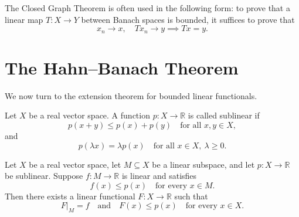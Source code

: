 \begin{remark}
    The Closed Graph Theorem is often used in the following form: to prove that a linear map \(T : X \to Y\) between Banach spaces is bounded, it suffices to prove that
    \[
        x_n \to x, \quad Tx_n \to y \implies Tx = y.
    \]
\end{remark}

\section{The Hahn--Banach Theorem}
We now turn to the extension theorem for bounded linear functionals.

\begin{definition}
    Let \(X\) be a real vector space. A function \(p : X \to \mathbb{R}\) is called sublinear if
    \[
        p(x + y) \leq p(x) + p(y) \quad \text{for all } x, y \in X,
    \]
    and
    \[
        p(\lambda x) = \lambda p(x) \quad \text{for all } x \in X,\ \lambda \geq 0.
    \]
\end{definition}

\begin{theorem} \label{thm: hahn-banach real form}
    Let \(X\) be a real vector space, let \(M \subseteq X\) be a linear subspace, and let \(p : X \to \mathbb{R}\) be sublinear. Suppose \(f : M \to \mathbb{R}\) is linear and satisfies
    \[
        f(x) \leq p(x) \quad \text{for every } x \in M.
    \]
    Then there exists a linear functional \(F : X \to \mathbb{R}\) such that
    \[
        F\vert_M = f \quad \text{and} \quad F(x) \leq p(x) \quad \text{for every } x \in X.
    \]
\end{theorem}

